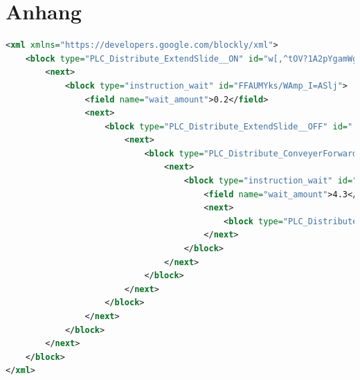 \chapter{Anhang}
\label{cha:anhang}

\begin{lstlisting}[language=XML,caption={XML Code für simplen Prozess},captionpos=b,label={lst:anhang_code_xml}]
<xml xmlns="https://developers.google.com/blockly/xml">
    <block type="PLC_Distribute_ExtendSlide__ON" id="w[,^tOV?1A2pYgamWghr" x="15" y="88">
        <next>
            <block type="instruction_wait" id="FFAUMYks/WAmp_I=ASlj">
                <field name="wait_amount">0.2</field>
                <next>
                    <block type="PLC_Distribute_ExtendSlide__OFF" id=".[Hx1gsNm1`I_?Epql~O">
                        <next>
                            <block type="PLC_Distribute_ConveyerForward__ON" id="6k8D(GT3vcFL96uzt3-+">
                                <next>
                                    <block type="instruction_wait" id="qi(*IulXH*3u9LH3,j`z">
                                        <field name="wait_amount">4.3</field>
                                        <next>
                                            <block type="PLC_Distribute_ConveyerForwa rd__OFF" id="1jdIM*0Nm(ulS29B3{LF"/>
                                        </next>
                                    </block>
                                </next>
                            </block>
                        </next>
                    </block>
                </next>
            </block>
        </next>
    </block>
</xml>
\end{lstlisting}

